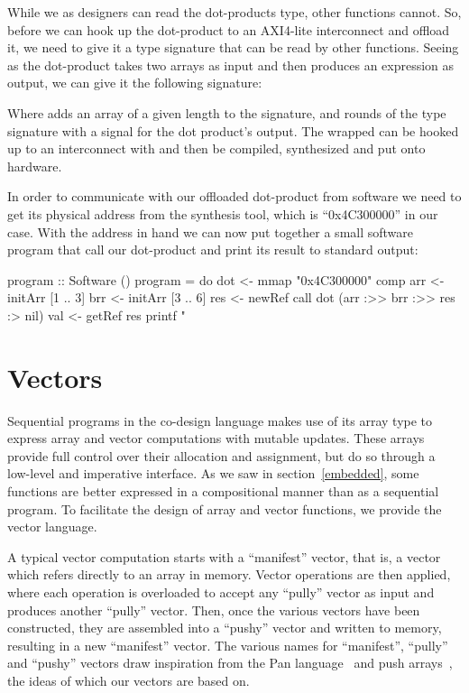 \documentclass[../paper.tex]{subfiles}
\begin{document}
\noindent While we as designers can read the dot-products type, other functions cannot. So, before we can hook up the dot-product to an AXI4-lite interconnect and offload it, we need to give it a type signature that can be read by other functions. Seeing as the dot-product takes two arrays as input and then produces an expression as output, we can give it the following signature:


\noindent Where  adds an array of a given length to the signature, and  rounds of the type signature with a signal for the dot product's output. The wrapped  can be hooked up to an interconnect with  and then be compiled, synthesized and put onto hardware.

In order to communicate with our offloaded dot-product from software we need to get its physical address from the synthesis tool, which is ``0x4C300000'' in our case. With the address in hand we can now put together a small software program that call our dot-product and print its result to standard output:

\begin{code}
program :: Software ()
program = do
  dot <- mmap "0x4C300000" comp
  arr <- initArr [1 .. 3]
  brr <- initArr [3 .. 6]
  res <- newRef
  call dot (arr :>> brr :>> res :> nil)
  val <- getRef res
  printf "%
\end{code}

\section{Vectors}
\label{vectors}

Sequential programs in the co-design language makes use of its array type to express array and vector computations with mutable updates. These arrays provide full control over their allocation and assignment, but do so through a low-level and imperative interface. As we saw in section~\ref{embedded}, some functions are better expressed in a compositional manner than as a sequential program. To facilitate the design of array and vector functions, we provide the vector language. 

A typical vector computation starts with a ``manifest'' vector, that is, a vector which refers directly to an array in memory. Vector operations are then applied, where each operation is overloaded to accept any ``pully'' vector as input and produces another ``pully'' vector. Then, once the various vectors have been constructed, they are assembled into a ``pushy'' vector and written to memory, resulting in a new ``manifest'' vector. The various names for ``manifest'', ``pully'' and ``pushy'' vectors draw inspiration from the Pan language~\cite{elliott2003} and push arrays~\cite{claessen2012}, the ideas of which our vectors are based on.
\end{document}
